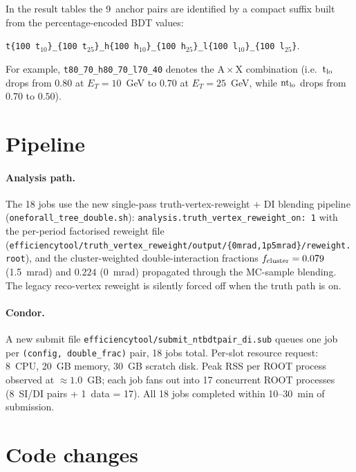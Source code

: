 \documentclass[11pt]{article}
\begin{document}
\noindent In the result tables the 9~anchor pairs are identified by a
compact suffix built from the percentage-encoded BDT values:
\begin{center}
\texttt{t\{100\,t$_{10}$\}\_\{100\,t$_{25}$\}\_h\{100\,h$_{10}$\}\_\{100\,h$_{25}$\}\_l\{100\,l$_{10}$\}\_\{100\,l$_{25}$\}}.
\end{center}
For example, \texttt{t80\_70\_h80\_70\_l70\_40} denotes the
A\,$\times$\,X combination (i.e.\ $\mathrm{t}_{\rm lo}$ drops from
$0.80$ at $E_T = 10$~GeV to $0.70$ at $E_T = 25$~GeV, while
$\mathrm{nt}_{\rm lo}$ drops from $0.70$ to $0.50$).

\section{Pipeline}

\paragraph{Analysis path.} The 18 jobs use the new single-pass
truth-vertex-reweight + DI blending pipeline
(\texttt{oneforall\_tree\_double.sh}):
\texttt{analysis.truth\_vertex\_reweight\_on: 1} with the per-period
factorised reweight file
(\texttt{efficiencytool/truth\_vertex\_reweight/output/\{0mrad,1p5mrad\}/re\-weight.root}),
and the cluster-weighted double-interaction fractions $f_{\rm cluster} = 0.079$
(1.5~mrad) and $0.224$ (0~mrad) propagated through the MC-sample blending.
The legacy reco-vertex reweight is silently forced off when the truth path is on.

\paragraph{Condor.} A new submit file
\texttt{efficiencytool/submit\_ntbdtpair\_di.sub} queues one job per
\texttt{(config, double\_frac)} pair, 18 jobs total. Per-slot resource
request: 8~CPU, 20~GB memory, 30~GB scratch disk. Peak RSS per ROOT
process observed at $\approx 1.0$~GB; each job fans out into 17 concurrent
ROOT processes (8~SI/DI pairs + 1~data = 17). All 18 jobs completed
within 10--30~min of submission.

\section{Code changes}
\end{document}
